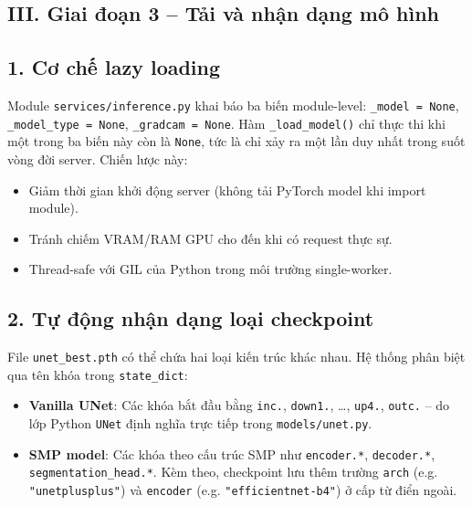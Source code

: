 \subsection*{III. Giai đoạn 3 -- Tải và nhận dạng mô hình}

\subsection*{1. Cơ chế lazy loading}

Module \texttt{services/inference.py} khai báo ba biến module-level: \texttt{\_model = None}, \texttt{\_model\_type = None}, \texttt{\_gradcam = None}. Hàm \texttt{\_load\_model()} chỉ thực thi khi một trong ba biến này còn là \texttt{None}, tức là chỉ xảy ra một lần duy nhất trong suốt vòng đời server. Chiến lược này:

\begin{itemize}
    \item Giảm thời gian khởi động server (không tải PyTorch model khi import module).
    \item Tránh chiếm VRAM/RAM GPU cho đến khi có request thực sự.
    \item Thread-safe với GIL của Python trong môi trường single-worker.
\end{itemize}

\subsection*{2. Tự động nhận dạng loại checkpoint}

File \texttt{unet\_best.pth} có thể chứa hai loại kiến trúc khác nhau. Hệ thống phân biệt qua tên khóa trong \texttt{state\_dict}:

\begin{sloppypar}
\begin{itemize}
    \item \textbf{Vanilla UNet}: Các khóa bắt đầu bằng \texttt{inc.}, \texttt{down1.}, \ldots, \texttt{up4.}, \texttt{outc.} -- do lớp Python \texttt{UNet} định nghĩa trực tiếp trong \texttt{models/unet.py}.
    \item \textbf{SMP model}: Các khóa theo cấu trúc SMP như \texttt{encoder.*}, \texttt{decoder.*}, \texttt{segmentation\_head.*}. Kèm theo, checkpoint lưu thêm trường \texttt{arch} (e.g. \texttt{"unetplusplus"}) và \texttt{encoder} (e.g. \texttt{"efficientnet-b4"}) ở cấp từ điển ngoài.
\end{itemize}
\end{sloppypar}


